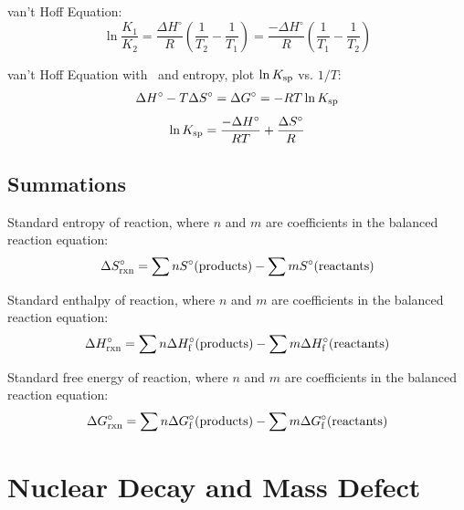 \documentclass[10pt]{article}
\begin{document}
van't Hoff Equation:
\begin{equation*}
\ln \frac{K_1}{K_2} = \frac{\Delta H^\circ}{R}\left(\frac{1}{T_2}-\frac{1}{T_1}\right) = \frac{-\Delta H^\circ}{R}\left(\frac{1}{T_1}-\frac{1}{T_2}\right)
\end{equation*}

van't Hoff Equation with \Ksp\ and entropy, plot $\ln K_\textnormal{sp}$ vs. $1/T$:
\begin{equation*}
\Delta H^{\circ} - T\Delta S^{\circ} = \Delta G^{\circ} = -RT \ln K_\textnormal{sp}
\end{equation*}
\begin{equation*}
\ln K_\textnormal{sp} = \frac{-\Delta H^{\circ}}{RT} + \frac{\Delta S^{\circ}}{R}
\end{equation*}

\subsection{Summations}

Standard entropy of reaction, where $n$ and $m$ are coefficients in the balanced reaction equation:
\begin{equation*}
\Delta S\not_\textnormal{rxn} = \sum{nS\not(\textnormal{products})}-\sum{mS\not(\textnormal{reactants})}
\end{equation*}

Standard enthalpy of reaction, where $n$ and $m$ are coefficients in the balanced reaction equation:
\begin{equation*}
\Delta H\not_\textnormal{rxn} = \sum{n\Delta H\not_\textnormal{f}(\textnormal{products})}-\sum{m\Delta H\not_\textnormal{f}(\textnormal{reactants})}
\end{equation*}

Standard free energy of reaction, where $n$ and $m$ are coefficients in the balanced reaction equation:
\begin{equation*}
\Delta G\not_\textnormal{rxn} = \sum{n\Delta G\not_\textnormal{f}(\textnormal{products})}-\sum{m\Delta G\not_\textnormal{f}(\textnormal{reactants})}
\end{equation*}


\section{Nuclear Decay and Mass Defect}
\end{document}
